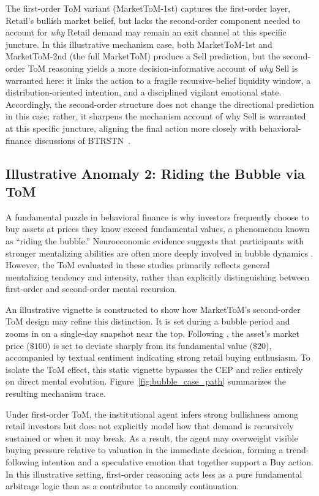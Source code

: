 \documentclass[a4paper,fleqn,doubleblind]{cas-sc}
\begin{document}
The first-order ToM variant (MarketToM-1st) captures the first-order layer, Retail's bullish market belief, but lacks the second-order component needed to account for \emph{why} Retail demand may remain an exit channel at this specific juncture. In this illustrative mechanism case, both MarketToM-1st and MarketToM-2nd (the full MarketToM) produce a Sell prediction, but the second-order ToM reasoning yields a more decision-informative account of \emph{why} Sell is warranted here: it links the action to a fragile recursive-belief liquidity window, a distribution-oriented intention, and a disciplined vigilant emotional state. Accordingly, the second-order structure does not change the directional prediction in this case; rather, it sharpens the mechanism account of why Sell is warranted at this specific juncture, aligning the final action more closely with behavioral-finance discussions of BTRSTN~\citep{daniel1998,deBondt1985}.


\subsection{Illustrative Anomaly 2: Riding the Bubble via ToM}
A fundamental puzzle in behavioral finance is why investors frequently choose to buy assets at prices they know exceed fundamental values, a phenomenon known as ``riding the bubble.'' Neuroeconomic evidence suggests that participants with stronger mentalizing abilities are often more deeply involved in bubble dynamics \citep{bossaerts2019perception,de2013mind,hefti2025mental}. However, the ToM evaluated in these studies primarily reflects general mentalizing tendency and intensity, rather than explicitly distinguishing between first-order and second-order mental recursion.

An illustrative vignette is constructed to show how MarketToM's second-order ToM design may refine this distinction. It is set during a bubble period and zooms in on a single-day snapshot near the top. Following \citet{de2013mind}, the asset's market price ($\$100$) is set to deviate sharply from its fundamental value ($\$20$), accompanied by textual sentiment indicating strong retail buying enthusiasm. To isolate the ToM effect, this static vignette bypasses the CEP and relies entirely on direct mental evolution. Figure~\ref{fig:bubble_case_path} summarizes the resulting mechanism trace.

Under first-order ToM, the institutional agent infers strong bullishness among retail investors but does not explicitly model how that demand is recursively sustained or when it may break. As a result, the agent may overweight visible buying pressure relative to valuation in the immediate decision, forming a trend-following intention and a speculative emotion that together support a Buy action. In this illustrative setting, first-order reasoning acts less as a pure fundamental arbitrage logic than as a contributor to anomaly continuation.
\end{document}
